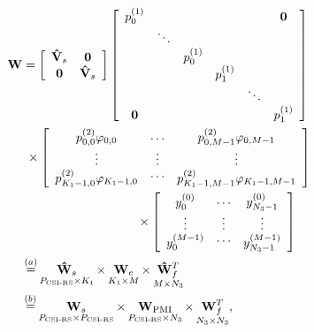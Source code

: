 \documentclass[lettersize,journal]{IEEEtran}
\begin{document}
\begin{align}
{\bf{W}} &= \left[ {\begin{array}{*{20}{c}}
{{{{\bf{\hat V}}}_s}}&{\bf{0}}\\
{\bf{0}}&{{{{\bf{\hat V}}}_s}}
\end{array}} \right]\left[ {\begin{array}{*{20}{c}}
{p_0^{(1)}}&{}&{}&{}&{}&{\bf{0}}\\
{}& \ddots &{}&{}&{}&{}\\
{}&{}&{p_0^{(1)}}&{}&{}&{}\\
{}&{}&{}&{p_1^{(1)}}&{}&{}\\
{}&{}&{}&{}& \ddots &{}\\
{\bf{0}}&{}&{}&{}&{}&{p_1^{(1)}}
\end{array}} \right] \notag\\
& \; \times \left[ {\begin{array}{*{20}{c}}
{p_{0,0}^{(2)}{\varphi _{0,0}}}\\
 \vdots \\
{p_{K_1 - 1,0}^{(2)}{\varphi _{K_1 - 1,0}}}
\end{array}\begin{array}{*{20}{c}}
 \cdots \\
 \vdots \\
 \cdots 
\end{array}\begin{array}{*{20}{c}}
{p_{0,{M} - 1}^{(2)}{\varphi _{0,{M} - 1}}}\\
 \vdots \\
{p_{K_1 - 1,{M} - 1}^{(2)}{\varphi _{K_1 - 1,{M} - 1}}}
\end{array}} \right]\notag\\
&\qquad \qquad  \qquad \qquad \quad \; \times \left[ {\begin{array}{*{20}{c}}
{y_0^{(0)}}\\
 \vdots \\
{y_0^{({M} - 1)}}
\end{array}\begin{array}{*{20}{c}}
 \cdots \\
 \vdots \\
 \cdots 
\end{array}\begin{array}{*{20}{c}}
{y_{{N_3} - 1}^{(0)}}\\
 \vdots \\
{y_{{N_3} - 1}^{({M} - 1)}}
\end{array}} \right] \notag\\
&\mathop  = \limits^{(a)} \mathop {{{{\bf{\hat W}}}_s}}\limits_{{P_{{\text{CSI-RS}}}} \times K_1} \times \mathop {{{\bf{W}}_c}}\limits_{K_1 \times {M}} \times \mathop {{\bf{\hat W}}_f^T}\limits_{{M} \times {N_3}} \notag\\
&\mathop  = \limits^{(b)} \mathop {{{\bf{W}}_s}}\limits_{{P_{{\text{CSI-RS}}}} \times {P_{{\text{CSI-RS}}}}} \times \mathop {{{\bf{W}}_{{\rm{PMI}}}}}\limits_{{P_{{\text{CSI-RS}}}} \times {N_3}} \times \mathop {{\bf{W}}_f^T}\limits_{{N_3} \times {N_3}} ,
\end{align}
\end{document}
